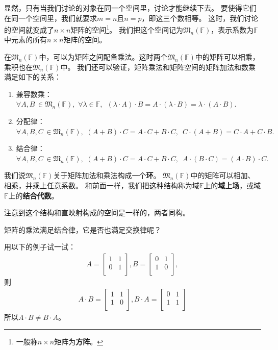 \documentclass[12pt,UTF8]{ctexbook}
\begin{document}
显然，只有当我们讨论的对象在同一个空间里，讨论才能继续下去。
要使得它们在同一个空间里，我们就要求$m=n$且$n=p$，即这三个数相等。
这时，我们讨论的空间就变成了$n\times n$矩阵的空间\footnote{一般称$n\times n$矩阵为\textbf{方阵}。}。
我们把这个空间记为$\mathfrak{M}_n(\mathbb{F})$，表示系数为$\mathbb{F}$中元素的所有$n\times n$矩阵的空间。

在$\mathfrak{M}_n(\mathbb{F})$中，可以为矩阵之间配备乘法。这时两个$\mathfrak{M}_n(\mathbb{F})$中的矩阵可以相乘，乘积也在$\mathfrak{M}_n(\mathbb{F})$中。
我们还可以验证，矩阵乘法和矩阵空间的矩阵加法和数乘满足如下的关系：
\begin{enumerate}
    \item 兼容数乘：$\forall A,B \,\in \mathfrak{M}_n(\mathbb{F}), \,\, \forall \lambda\in\mathbb{F}, \,\,\, (\lambda\cdot A)\cdot B =  A \cdot (\lambda\cdot B) = \lambda\cdot (A\cdot B). $
    \item 分配律：$\forall A,B,C \,\in \mathfrak{M}_n(\mathbb{F}), \,\, (A + B)\cdot C = A\cdot C + B\cdot C,\,\,\, C\cdot (A + B) = C\cdot A + C\cdot B.$
    \item 结合律：$\forall A,B,C \,\in \mathfrak{M}_n(\mathbb{F}), \,\, (A + B)\cdot C = A\cdot C + B\cdot C,\,\,\, A\cdot(B\cdot C) = (A\cdot B)\cdot C.$
\end{enumerate}
我们说$\mathfrak{M}_n(\mathbb{F})$关于矩阵加法和乘法构成一个\textbf{环}。
$\mathfrak{M}_n(\mathbb{F})$中的矩阵可以相加、相乘，并乘上任意系数。
和前面一样，我们把这种结构称为域$\mathbb{F}$上的\textbf{域上场}，或域$\mathbb{F}$上的\textbf{结合代数}。

注意到这个结构和直映射构成的空间是一样的，两者同构。

矩阵的乘法满足结合律，它是否也满足交换律呢？

用以下的例子试一试：
\begin{align*}
    A = \begin{bmatrix}
        1     & 1  \\
        0     & 1 \\
    \end{bmatrix}, 
    B = \begin{bmatrix}
        0     & 1  \\
        1     & 0  \\
    \end{bmatrix}, 
\end{align*}
则
\begin{align*}
    A \cdot B = \begin{bmatrix}
        1     & 1  \\
        1     & 0 \\
    \end{bmatrix}, 
    B \cdot A = \begin{bmatrix}
        0     & 1  \\
        1     & 1  \\
    \end{bmatrix} 
\end{align*}
所以$A\cdot B \neq B \cdot A$。
\end{document}
